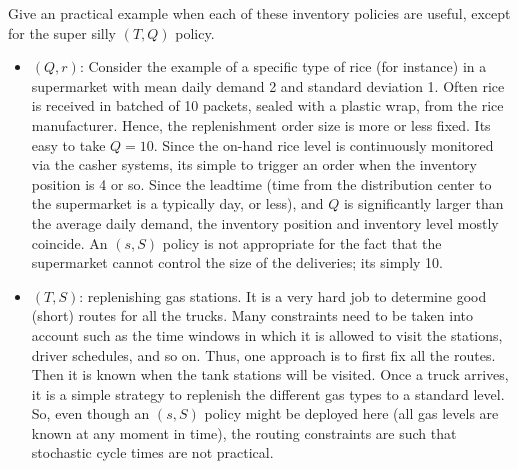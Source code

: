 \begin{exercise}
  Give an practical example when each of these inventory policies are useful, except for the super silly $(T,Q)$ policy.
  \begin{solution}
    \begin{itemize}
    \item $(Q,r)$: Consider the example of a specific type of rice (for instance) in a supermarket with mean daily demand  2 and  standard deviation 1. Often rice is received in batched of 10 packets, sealed with a plastic wrap, from the rice manufacturer. Hence, the replenishment order size is more or less fixed. Its easy to take $Q=10$. Since the on-hand rice level is continuously monitored via the casher systems, its simple to trigger an order when the inventory position is 4 or so. Since the leadtime (time from the distribution center to the supermarket is a typically day, or less), and $Q$ is significantly larger than the average daily demand, the inventory position and inventory level mostly coincide. An $(s,S)$ policy is not appropriate for the fact that the supermarket cannot control the size of the deliveries; its simply 10.
    \item $(T,S)$: replenishing gas stations. It is a very hard job to determine good (short) routes for all the trucks. Many constraints need to be taken into account such as the time windows in which it is allowed to visit the stations, driver schedules, and so on. Thus, one approach is to first fix all the routes. Then it is known when the tank stations will be visited. Once a truck arrives, it is a simple strategy to replenish the different gas types to a standard level. So, even though an $(s,S)$ policy might be deployed here (all gas levels are known at any moment in time), the routing constraints are such that stochastic cycle times are not practical. 


\end{itemize}
\end{solution}
\end{exercise}
